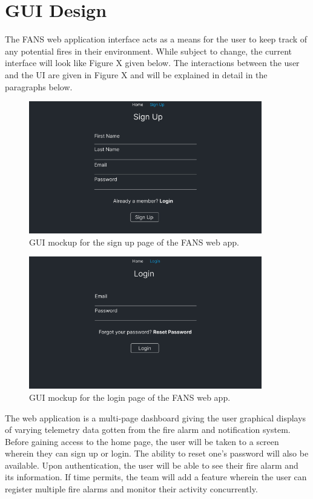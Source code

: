 \section{GUI Design}

The FANS web application interface acts as a means for the user to keep track of any potential fires in their
environment. While subject to change, the current interface will look like Figure X given below. The interactions
between the user and the UI are given in Figure X and will be explained in detail in the paragraphs below.

\begin{figure}[H]
    \centering
    \includegraphics[width=4in]{../assets/SignUpPage.png}
    \caption{GUI mockup for the sign up page of the FANS web app.}
\end{figure}

\begin{figure}[H]
    \centering
    \includegraphics[width=4in]{../assets/LoginPage.png}
    \caption{GUI mockup for the login page of the FANS web app.}
\end{figure}

The web application is a multi-page dashboard giving the user graphical displays of varying telemetry data gotten from
the fire alarm and notification system. Before gaining access to the home page, the user will be taken to a screen
wherein they can sign up or login. The ability to reset one's password will also be available. Upon authentication, the
user will be able to see their fire alarm and its information. If time permits, the team will add a feature wherein the
user can register multiple fire alarms and monitor their activity concurrently.

